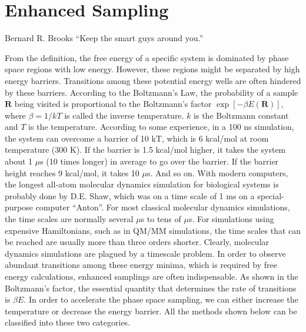 \chapter{Enhanced Sampling\label{chapter:ES}}
\begin{chapquote}{Bernard R. Brooks%
	}
	``Keep the smart guys around you.''
\end{chapquote}
From the definition, the free energy of a specific system is dominated by phase space regions with low energy. However, these regions might be separated by high energy barriers. Transitions among these potential energy wells are often hindered by these barriers. According to the Boltzmann's Law, the probability of a sample $\mathbf{R}$ being visited is proportional to the Boltzmann's factor $\exp{\left[-\beta E(\mathbf{R})\right]}$, where $\beta=1/kT$ is called the inverse temperature. $k$ is the Boltzmann constant and $T$ is the temperature. According to some experience, in a 100 ns simulation, the system can overcome a barrier of 10 kT, which is 6 kcal/mol at room temperature (300 K). If the barrier is 1.5 kcal/mol higher, it takes the system about 1 $\mu$s (10 times longer) in average to go over the barrier. If the barrier height reaches 9 kcal/mol, it takes 10 $\mu$s. And so on. With modern computers, the longest all-atom molecular dynamics simulation for biological systems is probably done by D.E. Shaw, which was on a time scale of 1 ms on a special-purpose computer ``Anton''. For most classical molecular dynamics simulations, the time scales are normally several $\mu$s to tens of $\mu$s. For simulations using expensive Hamiltonians, such as in QM/MM simulations, the time scales that can be reached are usually more than three orders shorter. Clearly, molecular dynamics simulations are plagued by a timescale problem. In order to observe abundant transitions among these energy minima, which is required by free energy calculations, enhanced samplings are often indispensable. As shown in the Boltzmann's factor, the essential quantity that determines the rate of transitions is $\beta E$. In order to accelerate the phase space sampling, we can either increase the temperature or decrease the energy barrier. All the methods shown below can be classified into these two categories. 
\clearpage 

\clearpage 

\clearpage 

\clearpage 

\clearpage 

\clearpage

%
